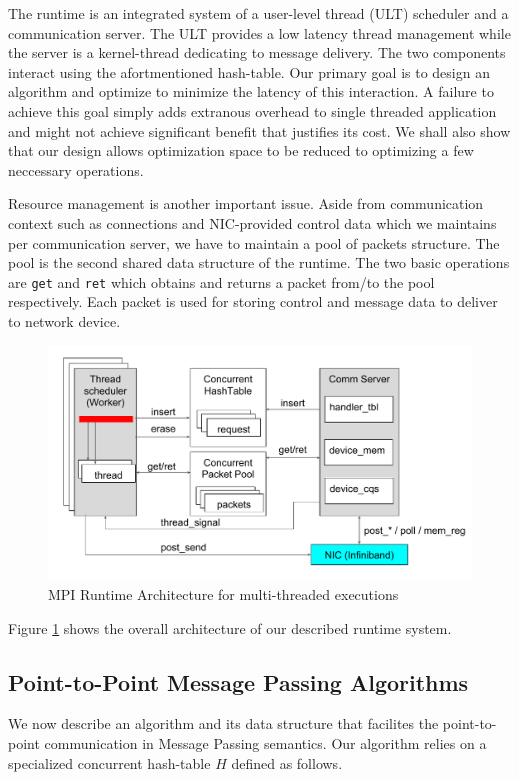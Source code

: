 The runtime is an integrated system of a user-level thread (ULT) scheduler and
a communication server. The ULT provides a low latency thread management while
the server is a kernel-thread dedicating to message delivery. The two
components interact using the afortmentioned hash-table.  Our primary goal is
to design an algorithm and optimize to minimize the latency of this
interaction. A failure to achieve this goal simply adds extranous overhead to
single threaded application and might not achieve significant benefit that
justifies its cost. We shall also show that our design allows optimization space
to be reduced to optimizing a few neccessary operations.

Resource management is another important issue. Aside from communication
context such as connections and NIC-provided control data which we maintains
per communication server, we have to maintain a pool of packets structure. The
pool is the second shared data structure of the runtime. The two basic operations
are \texttt{get} and \texttt{ret} which obtains and returns a packet from/to
the pool respectively. Each packet is used for storing control and message data
to deliver to network device.

\begin{figure}[!ht]
  \centering
  \includegraphics[width=.6\textwidth]{fig/runtime.pdf}
  \caption{MPI Runtime Architecture for multi-threaded executions}\label{fig:overall}
\end{figure}

Figure \ref{fig:overall} shows the overall architecture of our described
runtime system.

\subsection{Point-to-Point Message Passing Algorithms}
We now describe an algorithm and its data structure that facilites the
point-to-point communication in Message Passing semantics. Our algorithm relies
on a specialized concurrent hash-table $H$ defined as follows.

